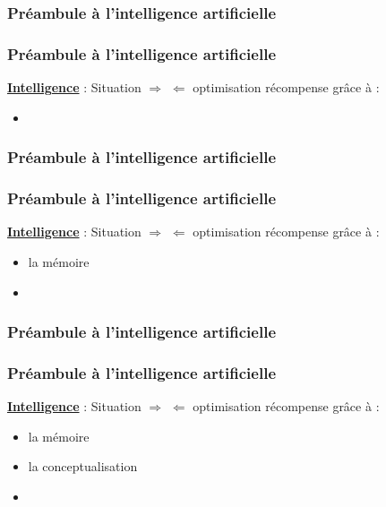 \begin{frame}
  \frametitle{Préambule à l'intelligence artificielle}
\end{frame}

\begin{frame}
  \frametitle{Préambule à l'intelligence artificielle}
  \underline{\textbf{Intelligence}} :
  \newline
  \newline
  Situation $\Rightarrow$  $\Leftarrow$ optimisation récompense
  \newline
  \newline
  grâce à :
  \begin{itemize}
  \item {}
  \end{itemize}
\end{frame}

\begin{frame}
  \frametitle{Préambule à l'intelligence artificielle}
\end{frame}

\begin{frame}
  \frametitle{Préambule à l'intelligence artificielle}
  \underline{\textbf{Intelligence}} :
  \newline
  \newline
  Situation $\Rightarrow$  $\Leftarrow$ optimisation récompense
  \newline
  grâce à :
  \begin{itemize}
  \item la mémoire
  \item {}
  \end{itemize}
\end{frame}

\begin{frame}
  \frametitle{Préambule à l'intelligence artificielle}
\end{frame}

\begin{frame}
  \frametitle{Préambule à l'intelligence artificielle}
  \underline{\textbf{Intelligence}} :
  \newline
  \newline
  Situation $\Rightarrow$  $\Leftarrow$ optimisation récompense
  \newline
  grâce à :
  \begin{itemize}
  \item la mémoire
  \item la conceptualisation
  \item {}
  \end{itemize}
\end{frame}

